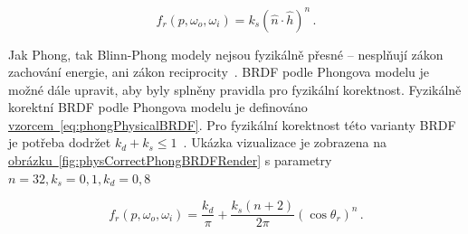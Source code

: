 \documentclass[czech,master]{diploma}
\newcommand{\uvec}[1]{\hat{#1}}
\newcommand{\point}{p}
\newcommand{\brdf}{f_r\left(\point,\omega_{o},\omega_{i}\right)}
\newcommand{\normVec}{\uvec{n}}
\newcommand{\halfVec}{\uvec{h}}
\begin{document}
\begin{equation} \label{eq:blinnBRDF}
  \brdf = k_s{(\normVec\cdot\halfVec)}^{n}\,.
\end{equation}

Jak Phong, tak Blinn-Phong modely nejsou fyzikálně přesné -- nesplňují zákon zachování energie, ani zákon reciprocity~\cite{BRDFOverview}. BRDF podle Phongova modelu je možné dále upravit, aby byly splněny pravidla pro fyzikální korektnost. Fyzikálně korektní BRDF podle Phongova modelu je definováno \hyperref[eq:phongPhysicalBRDF]{vzorcem~\ref{eq:phongPhysicalBRDF}}. Pro fyzikální korektnost této varianty BRDF je potřeba dodržet \(k_d + k_s \leq 1\)~\cite{LaFortunePhongBRDF}. Ukázka vizualizace je zobrazena na \hyperref[fig:physCorrectPhongBRDFRender]{obrázku~\ref{fig:physCorrectPhongBRDFRender}} s parametry \(n = 32, k_s = 0{,}1, k_d = 0{,}8\)

\begin{equation} \label{eq:phongPhysicalBRDF}
  \brdf = \frac{k_d}{\pi} +
  \frac{k_s\left(n+2\right)}{2\pi}{\left(\cos\theta_r\right)}^{n}\,.
\end{equation}
\end{document}
